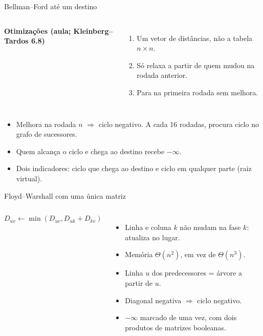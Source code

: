 \documentclass[10pt,aspectratio=169]{beamer}
\begin{document}
\begin{frame}{Bellman--Ford até um destino}
\begin{columns}[T,onlytextwidth]
\textbf{Otimizações (aula; Kleinberg--Tardos 6.8)}
\begin{enumerate}
\item Um vetor de distâncias, não a tabela \(n\times n\).
\item Só relaxa a partir de quem mudou na rodada anterior.
\item Para na primeira rodada sem melhora.
\end{enumerate}
\centering
{}
\end{columns}
\medskip
\begin{itemize}
\item Melhora na rodada \(n\) \(\Rightarrow\) ciclo negativo. A cada 16 rodadas, procura ciclo no grafo de sucessores.
\item Quem alcança o ciclo e chega ao destino recebe \(-\infty\).
\item Dois indicadores: ciclo que chega ao destino e ciclo em qualquer parte (raiz virtual).
\end{itemize}
\end{frame}

\begin{frame}{Floyd--Warshall com uma única matriz}
\begin{columns}[T,onlytextwidth]
\centering
{}
\[
  D_{uv}\gets\min(D_{uv},D_{uk}+D_{kv})
\]
\begin{itemize}
\item Linha e coluna \(k\) não mudam na fase \(k\): atualiza \alert{no lugar}.
\item Memória \(\Theta(n^2)\), em vez de \(\Theta(n^3)\).
\item Linha \(u\) dos predecessores = árvore a partir de \(u\).
\item Diagonal negativa \(\Rightarrow\) ciclo negativo.
\item \(-\infty\) marcado de uma vez, com dois produtos de matrizes booleanas.
\end{itemize}
\end{columns}
\end{frame}
\end{document}
